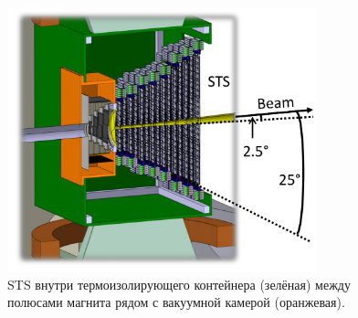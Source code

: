 
\begin{figure}[H]
\centering
\includegraphics[width=0.8\textwidth]{pictures/STS_1.png}
\caption{STS внутри термоизолирующего контейнера (зелёная) между полюсами магнита рядом с вакуумной камерой (оранжевая).}
\label{fig:STS12}
\end{figure}


